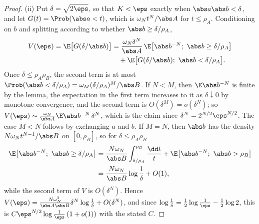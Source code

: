 \begin{refsection}
\begin{proof}
(ii) Put $\delta=\sqrt{2\eps}$, so that $K<\eps$ exactly when $\abs a\abs b<\delta$, and let $G(t)=\Prob(\abs a<t)$, which is $\omega_Nt^N/\abs A$ for $t\le\rho_A$. Conditioning on $b$ and splitting according to whether $\abs b\ge\delta/\rho_A$,
\[
\begin{aligned}
V(\eps)=\E\bigl[G(\delta/\abs b)\bigr]&=\frac{\omega_N\delta^N}{\abs A}\,\E\bigl[\abs b^{-N};\ \abs b\ge\delta/\rho_A\bigr]\\
&\quad+\E\bigl[G(\delta/\abs b);\ \abs b<\delta/\rho_A\bigr].
\end{aligned}
\]
Once $\delta\le\rho_A\rho_B$, the second term is at most $\Prob(\abs b<\delta/\rho_A)=\omega_M(\delta/\rho_A)^M/\abs B$. If $N<M$, then $\E\abs b^{-N}$ is finite by the lemma, the expectation in the first term increases to it as $\delta\downarrow0$ by monotone convergence, and the second term is $O(\delta^M)=o(\delta^N)$; so $V(\eps)\sim\frac{\omega_N}{\abs A}\E\abs b^{-N}\,\delta^N$, which is the claim since $\delta^N=2^{N/2}\eps^{N/2}$. The case $M<N$ follows by exchanging $a$ and $b$. If $M=N$, then $\abs b$ has the density $N\omega_Nt^{N-1}/\abs B$ on $[0,\rho_B]$, so for $\delta\le\rho_A\rho_B$
\[
\begin{aligned}
\E\bigl[\abs b^{-N};\ \abs b\ge\delta/\rho_A\bigr]&=\frac{N\omega_N}{\abs B}\int_{\delta/\rho_A}^{\rho_B}\frac{\dd t}t+\E\bigl[\abs b^{-N};\ \abs b>\rho_B\bigr]\\
&=\frac{N\omega_N}{\abs B}\log\frac1\delta+O(1),
\end{aligned}
\]
while the second term of $V$ is $O(\delta^N)$. Hence $V(\eps)=\frac{N\omega_N^2}{\abs A\abs B}\delta^N\log\frac1\delta+O(\delta^N)$, and since $\log\frac1\delta=\frac12\log\frac1\eps-\frac12\log2$, this is $C\eps^{N/2}\log\frac1\eps\,(1+o(1))$ with the stated $C$.
\end{proof}


\end{refsection}
